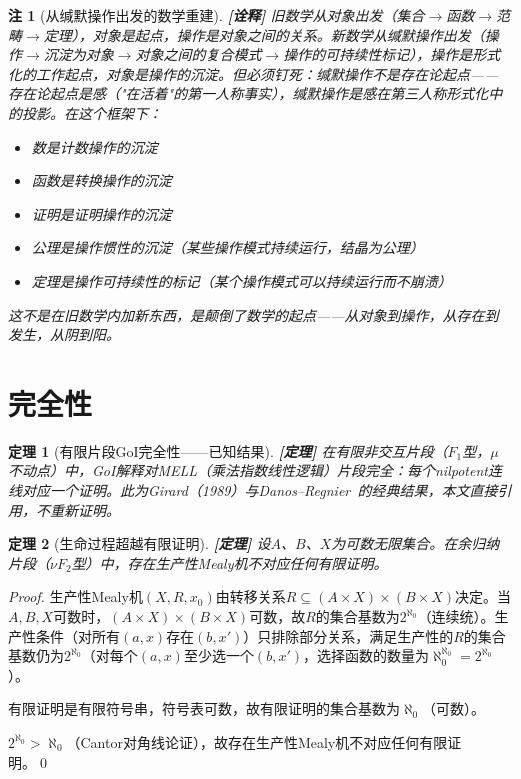 \documentclass[11pt,a4paper]{article}
\newtheorem{theorem}{定理}
\newtheorem{remark}{注}
\newcommand{\lvl}[1]{\hfill\textbf{\footnotesize[#1]}}
\newcommand{\lvP}{\lvl{定理}}
\newcommand{\lvI}{\lvl{诠释}}
\begin{document}
\begin{remark}[从缄默操作出发的数学重建]\lvI
旧数学从对象出发（集合$\to$函数$\to$范畴$\to$定理），对象是起点，操作是对象之间的关系。新数学从缄默操作出发（操作$\to$沉淀为对象$\to$对象之间的复合模式$\to$操作的可持续性标记），操作是形式化的工作起点，对象是操作的沉淀。但必须钉死：缄默操作不是存在论起点——存在论起点是感（"在活着"的第一人称事实），缄默操作是感在第三人称形式化中的投影。在这个框架下：
\begin{itemize}
  \item 数是计数操作的沉淀
  \item 函数是转换操作的沉淀
  \item 证明是证明操作的沉淀
  \item 公理是操作惯性的沉淀（某些操作模式持续运行，结晶为公理）
  \item 定理是操作可持续性的标记（某个操作模式可以持续运行而不崩溃）
\end{itemize}
这不是在旧数学内加新东西，是颠倒了数学的起点——从对象到操作，从存在到发生，从阴到阳。
\end{remark}

\section{完全性}

\begin{theorem}[有限片段GoI完全性——已知结果]\label{thm:completeness-finite}\lvP
在有限非交互片段（$F_1$型，$\mu$不动点）中，GoI解释对MELL（乘法指数线性逻辑）片段完全：每个nilpotent连线对应一个证明。此为Girard（1989）与Danos--Regnier~\cite{danos95}的经典结果，本文直接引用，不重新证明。
\end{theorem}

\begin{theorem}[生命过程超越有限证明]\label{thm:life-beyond-proof}\lvP
设$A$、$B$、$X$为可数无限集合。在余归纳片段（$\nu F_2$型）中，存在生产性Mealy机不对应任何有限证明。
\end{theorem}

\begin{proof}
生产性Mealy机$(X,R,x_0)$由转移关系$R\subseteq(A\times X)\times(B\times X)$决定。当$A,B,X$可数时，$(A\times X)\times(B\times X)$可数，故$R$的集合基数为$2^{\aleph_0}$（连续统）。生产性条件（对所有$(a,x)$存在$(b,x')$）只排除部分关系，满足生产性的$R$的集合基数仍为$2^{\aleph_0}$（对每个$(a,x)$至少选一个$(b,x')$，选择函数的数量为$\aleph_0^{\aleph_0}=2^{\aleph_0}$）。

有限证明是有限符号串，符号表可数，故有限证明的集合基数为$\aleph_0$（可数）。

$2^{\aleph_0}>\aleph_0$（Cantor对角线论证），故存在生产性Mealy机不对应任何有限证明。\qed
\end{proof}
\end{document}
